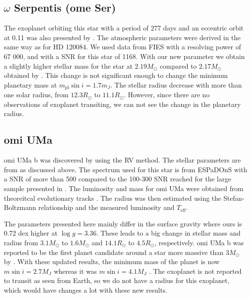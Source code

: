 \documentclass{aa}
\begin{document}
\subsection{$\omega$ Serpentis (ome Ser)}
\label{sub:ome_Ser}
The exoplanet orbiting this star with a period of 277 days and an eccentric
orbit at 0.11 was also presented by \citet{Sato2013}. The atmospheric parameters
were derived in the same way as for HD 120084. We used data from FIES with a
resolving power of 67 000, and with a SNR for this star of 1168. With our new
parameter we obtain a slightly higher stellar mass for the star at $2.19M_\odot$
compared to $2.17M_\odot$ obtained by \cite{Takeda2008}. This change is not
significant enough to change the minimum planetary mass at $m_\mathrm{pl}\sin
i=1.7m_J$. The stellar radius decrease with more than one solar radius, from
$12.3R_\odot$ to $11.1R_\odot$. However, since there are no observations of
exoplanet transiting, we can not see the change in the planetary radius.



\subsection{omi UMa}
\label{sub:omiUMa}
omi UMa b was discovered by \citet{Sato2012} using the RV method. The stellar
parameters are from \citet{Takeda2008} as discussed above. The spectrum used for
this star is from ESPaDOnS with a SNR of more than 500 compared to the 100-300
SNR reached for the large sample presented in \citet{Takeda2008}. The luminosity
and mass for omi UMa were obtained from theoreitcal evolutionary tracks
\citep[see][and references therein]{Sato2012}. The radius was then estimated
using the Stefan-Boltzmann relationship and the measured luminosity and
$T_\mathrm{eff}$.

The parameters presented here mainly differ in the surface gravity where ours is
0.72 dex higher at $\log g=3.36$. These leads to a big change in stellar mass
and radius from $3.1M_\odot$ to $1.6M_\odot$ and $14.1R_\odot$ to $4.5R_\odot$,
respectively. omi UMa b was reported to be the first planet candidate around a
star more massive than $3M_\odot$ by \citet{Sato2012}. With these updated
results, the minimum mass of the planet is now $m\sin i=2.7M_J$ whereas it was
$m\sin i=4.1M_J$ \citep{Sato2012}. The exoplanet is not reported to transit as
seen from Earth, so we do not have a radius for this exoplanet, which would have
changes a lot with these new results.
\end{document}
